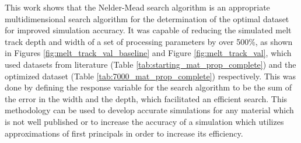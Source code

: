 \label{conclusions}

This work shows that the Nelder-Mead search algorithm is an appropriate multidimensional search algorithm for the determination of the optimal dataset for improved simulation accuracy.  It was capable of reducing the simulated melt track depth and width of a set of processing parameters by over 500\%, as shown in Figures \ref{fig:melt_track_val_baseline} and Figure \ref{fig:melt_track_val}, which used datasets from literature (Table \ref{tab:starting_mat_prop_complete}) and the optimized dataset (Table \ref{tab:7000_mat_prop_complete}) respectively.  This was done by defining the response variable for the search algorithm to be the sum of the error in the width and the depth, which facilitated an efficient search.  
This methodology can be used to develop accurate simulations for any material which is not well published or to increase the accuracy of a simulation which utilizes approximations of first principals in order to increase its efficiency.
